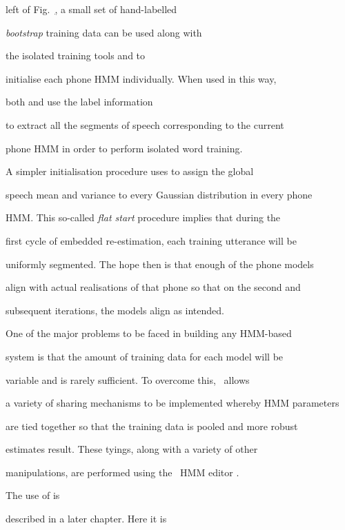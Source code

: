 left of Fig.~\href{f:subword}, a small set of hand-labelled 


\textit{bootstrap} training data can be used along with


the isolated training tools  and  to


initialise each phone HMM individually.  When used in this way,


both  and  use the label information


to extract all the segments of speech corresponding to the current


phone HMM in order to perform isolated word training.   





A simpler initialisation procedure uses  to assign the global


speech mean and variance to every Gaussian distribution in every phone


HMM.  This so-called \textit{flat start} procedure implies that during the


first cycle of embedded re-estimation, each training utterance will be


uniformly segmented.  The hope then is that enough of the phone models


align with actual realisations of that phone so that on the second and


subsequent iterations, the models align as intended.





One of the major problems to be faced in building any HMM-based


system is that the amount of training data for each model will be


variable and is rarely sufficient.  To overcome this, \HTK\ allows


a variety of sharing mechanisms to be implemented whereby HMM parameters


are tied together so that the training data is pooled and more robust


estimates result.  These tyings, along with a variety of other


manipulations, are performed using the  \HTK\ HMM editor .


The use of  is 


described in a later chapter.  Here it is



